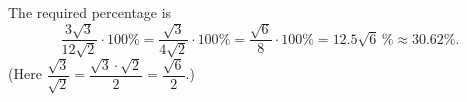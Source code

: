 The required percentage is
\[\dfrac{3\sqrt3}{12\sqrt2}\cdot100\%=\dfrac{\sqrt3}{4\sqrt2}\cdot100\%=\dfrac{\sqrt6}{8}\cdot100\%=\boxed{12.5\sqrt6\,\%}\approx30.62\%.\]
(Here $\dfrac{\sqrt3}{\sqrt2}=\dfrac{\sqrt3\cdot\sqrt2}{2}=\dfrac{\sqrt6}{2}$.)

